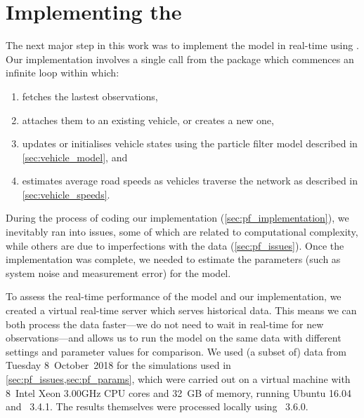 \section{Implementing the \rt{} \pf{}}
\label{sec:particle-filter}


The next major step in this work was to implement the model in real-time using \Cpp{}. Our implementation involves a single call from the \Rstats{} package  which commences an infinite loop within \Cpp{} which:
\begin{enumerate}
\item fetches the lastest observations,
\item attaches them to an existing vehicle, or creates a new one,
\item updates or initialises vehicle states using the particle filter model described in \cref{sec:vehicle_model}, and
\item estimates average road speeds as vehicles traverse the network as described in \cref{sec:vehicle_speeds}.
\end{enumerate}
During the process of coding our implementation (\cref{sec:pf_implementation}), we inevitably ran into issues, some of which are related to computational complexity, while others are due to imperfections with the data (\cref{sec:pf_issues}). Once the implementation was complete, we needed to estimate the parameters (such as system noise and measurement error) for the model.


To assess the real-time performance of the model and our \pf{} implementation, we created a virtual real-time server which serves historical data. This means we can both process the data faster---we do not need to wait in real-time for new observations---and allows us to run the model on the same data with different settings and parameter values for comparison. We used (a subset of) data from Tuesday 8~October~2018 for the simulations used in \cref{sec:pf_issues,sec:pf_params}, which were carried out on a virtual machine with 8~Intel Xeon 3.00GHz CPU cores and 32~GB of memory, running Ubuntu 16.04 and \Rstats{}~3.4.1. The results themselves were processed locally using \Rstats{}~3.6.0.









